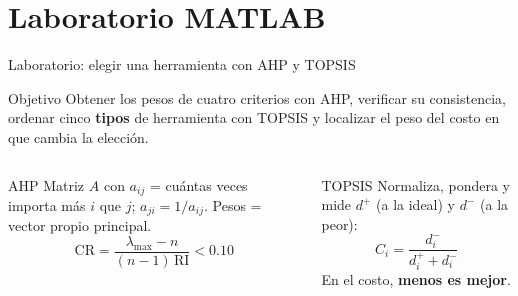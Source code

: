 \documentclass[aspectratio=169,xcolor=dvipsnames]{beamer}
\begin{document}
\section[Laboratorio]{Laboratorio MATLAB}

\begin{frame}{Laboratorio: elegir una herramienta con AHP y TOPSIS}
\begin{block}{Objetivo}
  Obtener los pesos de cuatro criterios con AHP, verificar su consistencia, ordenar cinco \textbf{tipos} de herramienta con TOPSIS y localizar el peso del costo en que cambia la elección.
\end{block}
\begin{columns}[T]
  \begin{exampleblock}{AHP}
    \scriptsize
    Matriz $A$ con $a_{ij}$ = cuántas veces importa más $i$ que $j$; $a_{ji}=1/a_{ij}$. Pesos = vector propio principal.
    \[ \mathrm{CR}=\frac{\lambda_{\max}-n}{(n-1)\,\mathrm{RI}} < 0.10 \]
  \end{exampleblock}
  \begin{block}{TOPSIS}
    \scriptsize
    Normaliza, pondera y mide $d^{+}$ (a la ideal) y $d^{-}$ (a la peor):
    \[ C_i=\frac{d_i^{-}}{d_i^{+}+d_i^{-}} \]
    En el costo, \textbf{menos es mejor}.
  \end{block}
\end{columns}
\end{frame}
\end{document}
